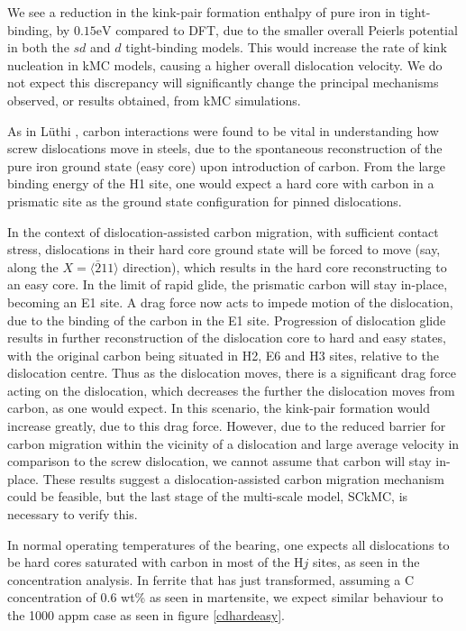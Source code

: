 \documentclass[a4paper,12pt,oneside,print,numbered,index,PageStyleIII]{PhDThesisPSnPDF}
\begin{document}
We see a reduction in the kink-pair formation enthalpy of pure iron in tight-binding,
by \(0.15 \text{eV}\) compared to DFT, due to the smaller overall Peierls potential in
both the \(sd\) and \(d\) tight-binding models. This would increase the rate of kink
nucleation in kMC models, causing a higher overall dislocation velocity. We do not
expect this discrepancy will significantly change the principal mechanisms observed,
or results obtained, from kMC simulations.


As in Lüthi \cite{Lthi2019}, carbon interactions were found to be vital in understanding how screw
dislocations move in steels, due to the spontaneous reconstruction of the pure iron ground state
(easy core) upon introduction of carbon. From the large binding energy of the H1 site, one would
expect a hard core with carbon in a prismatic site as the ground state configuration for pinned
dislocations.

In the context of dislocation-assisted carbon migration, with sufficient contact
stress, dislocations in their hard core ground state will be forced to move (say,
along the \(X = \langle\bar{2}11\rangle\) direction), which results in the hard core
reconstructing to an easy core. In the limit of rapid glide, the prismatic carbon will
stay in-place, becoming an E1 site. A drag force now acts to impede motion of the
dislocation, due to the binding of the carbon in the E1 site. Progression of
dislocation glide results in further reconstruction of the dislocation core to hard
and easy states, with the original carbon being situated in H2, E6 and H3 sites,
relative to the dislocation centre. Thus as the dislocation moves, there is a
significant drag force acting on the dislocation, which decreases the further the
dislocation moves from carbon, as one would expect. In this scenario, the kink-pair
formation would increase greatly, due to this drag force. However, due to the reduced
barrier for carbon migration within the vicinity of a dislocation and large average
velocity in comparison to the screw dislocation, we cannot assume that carbon will
stay in-place. These results suggest a dislocation-assisted carbon migration mechanism could be
feasible, but the last stage of the multi-scale model, SCkMC, is necessary to verify
this.



In normal operating temperatures of the bearing, one expects all dislocations to be hard cores
saturated with carbon in most of the \(\text{H}j\) sites, as seen in
the concentration analysis. In ferrite that has just transformed, assuming a C concentration of
0.6 wt\% as seen in martensite, we expect similar behaviour to the 1000 appm case as seen in
figure \ref{cdhardeasy}.
\end{document}
